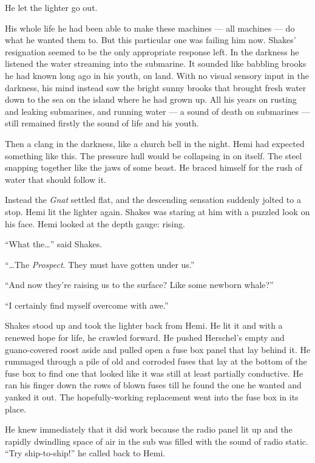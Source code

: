 \documentclass[
]{scrbook}
\begin{document}
He let the lighter go out.

His whole life he had been able to make these machines --- all machines
--- do what he wanted them to. But this particular one was failing him
now. Shakes' resignation seemed to be the only appropriate response
left. In the darkness he listened the water streaming into the
submarine. It sounded like babbling brooks he had known long ago in his
youth, on land. With no visual sensory input in the darkness, his mind
instead saw the bright sunny brooks that brought fresh water down to the
sea on the island where he had grown up. All his years on rusting and
leaking submarines, and running water --- a sound of death on submarines
--- still remained firstly the sound of life and his youth.

Then a clang in the darkness, like a church bell in the night. Hemi had
expected something like this. The pressure hull would be collapsing in
on itself. The steel snapping together like the jaws of some beast. He
braced himself for the rush of water that should follow it.

Instead the \emph{Gnat} settled flat, and the descending sensation
suddenly jolted to a stop. Hemi lit the lighter again. Shakes was
staring at him with a puzzled look on his face. Hemi looked at the depth
gauge: rising.

``What the\ldots{}'' said Shakes.

``\ldots The \emph{Prospect}. They must have gotten under us.''

``And now they're raising us to the surface? Like some newborn whale?''

``I certainly find myself overcome with awe.''

Shakes stood up and took the lighter back from Hemi. He lit it and with
a renewed hope for life, he crawled forward. He pushed Herschel's empty
and guano-covered roost aside and pulled open a fuse box panel that lay
behind it. He rummaged through a pile of old and corroded fuses that lay
at the bottom of the fuse box to find one that looked like it was still
at least partially conductive. He ran his finger down the rows of blown
fuses till he found the one he wanted and yanked it out. The
hopefully-working replacement went into the fuse box in its place.

He knew immediately that it did work because the radio panel lit up and
the rapidly dwindling space of air in the sub was filled with the sound
of radio static. ``Try ship-to-ship!'' he called back to Hemi.
\end{document}
